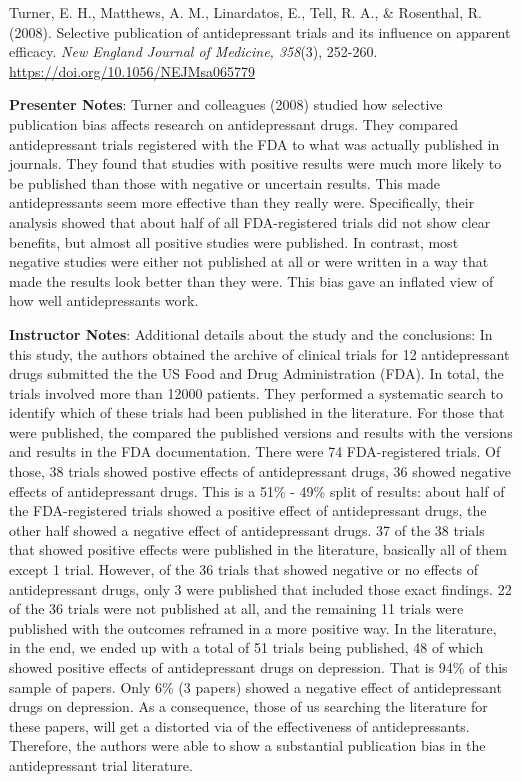 \documentclass[
  english,
  letterpaper,
  DIV=11,
  numbers=noendperiod]{scrartcl}
\begin{document}
Turner, E. H., Matthews, A. M., Linardatos, E., Tell, R. A., \&
Rosenthal, R. (2008). Selective publication of antidepressant trials and
its influence on apparent efficacy. \emph{New England Journal of
Medicine, 358}(3), 252-260. \url{https://doi.org/10.1056/NEJMsa065779}

\textbf{Presenter Notes}: Turner and colleagues (2008) studied how
selective publication bias affects research on antidepressant drugs.
They compared antidepressant trials registered with the FDA to what was
actually published in journals. They found that studies with positive
results were much more likely to be published than those with negative
or uncertain results. This made antidepressants seem more effective than
they really were. Specifically, their analysis showed that about half of
all FDA-registered trials did not show clear benefits, but almost all
positive studies were published. In contrast, most negative studies were
either not published at all or were written in a way that made the
results look better than they were. This bias gave an inflated view of
how well antidepressants work.

\textbf{Instructor Notes}: Additional details about the study and the
conclusions: In this study, the authors obtained the archive of clinical
trials for 12 antidepressant drugs submitted the the US Food and Drug
Administration (FDA). In total, the trials involved more than 12000
patients. They performed a systematic search to identify which of these
trials had been published in the literature. For those that were
published, the compared the published versions and results with the
versions and results in the FDA documentation. There were 74
FDA-registered trials. Of those, 38 trials showed postive effects of
antidepressant drugs, 36 showed negative effects of antidepressant
drugs. This is a 51\% - 49\% split of results: about half of the
FDA-registered trials showed a positive effect of antidepressant drugs,
the other half showed a negative effect of antidepressant drugs. 37 of
the 38 trials that showed positive effects were published in the
literature, basically all of them except 1 trial. However, of the 36
trials that showed negative or no effects of antidepressant drugs, only
3 were published that included those exact findings. 22 of the 36 trials
were not published at all, and the remaining 11 trials were published
with the outcomes reframed in a more positive way. In the literature, in
the end, we ended up with a total of 51 trials being published, 48 of
which showed positive effects of antidepressant drugs on depression.
That is 94\% of this sample of papers. Only 6\% (3 papers) showed a
negative effect of antidepressant drugs on depression. As a consequence,
those of us searching the literature for these papers, will get a
distorted via of the effectiveness of antidepressants. Therefore, the
authors were able to show a substantial publication bias in the
antidepressant trial literature.
\end{document}
